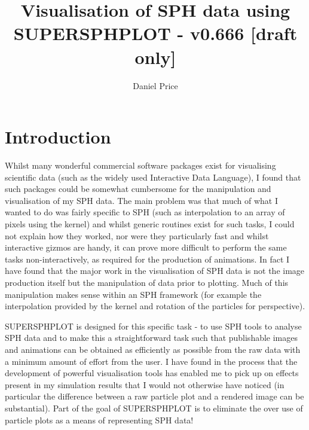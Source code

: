\documentclass[a4paper,12pt]{article}
\title{Visualisation of SPH data using SUPERSPHPLOT - v0.666 [draft only]}
\author{Daniel Price}
\begin{document}
\maketitle
\tableofcontents

\newpage
\section{Introduction}
 Whilst many wonderful commercial software packages exist for visualising scientific
data (such as the widely used Interactive Data Language), I found that such packages
could be somewhat cumbersome for the manipulation and visualisation of my SPH data. The
main problem was that much of what I wanted to do was fairly specific to SPH (such as
interpolation to an array of pixels using the kernel) and whilst generic routines exist
for such tasks, I could not explain how they worked, nor were they
particularly fast and whilst interactive gizmos are handy, it can prove more difficult to perform the
same tasks non-interactively, as required for the production of animations. 
In fact I have found that the major
work in the visualisation of SPH data is not the image production itself but the
manipulation of data prior to plotting. Much of this manipulation makes sense
within an SPH framework (for example the interpolation provided by the kernel
and rotation of the particles for perspective).

 SUPERSPHPLOT is designed for this specific task - to use SPH tools to analyse SPH data and to make this a
straightforward task such that publishable images and animations can be obtained
as efficiently as possible from the raw data with a minimum amount of effort
from the user. I have found in the process that the development of powerful
visualisation tools has enabled me to pick up on effects present in my
simulation results that I would not otherwise have noticed (in particular the
difference between a raw particle plot and a rendered image can be substantial). Part of the goal of SUPERSPHPLOT is to eliminate the over use of particle plots as a means of representing SPH data!
\end{document}
